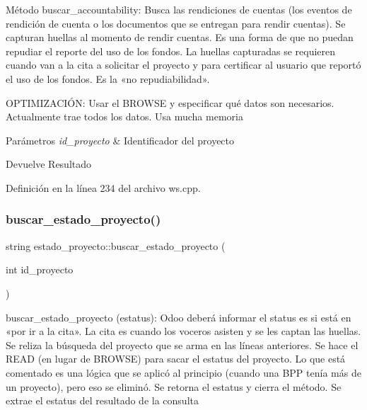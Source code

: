 Método buscar\+\_\+accountability\+: Busca las rendiciones de cuentas (los eventos de rendición de cuenta o los documentos que se entregan para rendir cuentas). Se capturan huellas al momento de rendir cuentas. Es una forma de que no puedan repudiar el reporte del uso de los fondos. La huellas capturadas se requieren cuando van a la cita a solicitar el proyecto y para certificar al usuario que reportó el uso de los fondos. Es la «no repudiabilidad». 

O\+P\+T\+I\+M\+I\+Z\+A\+C\+IÓN\+: Usar el B\+R\+O\+W\+SE y especificar qué datos son necesarios. Actualmente trae todos los datos. Usa mucha memoria


\begin{DoxyParams}{Parámetros}
{\em id\+\_\+proyecto} & Identificador del proyecto \\
\hline
\end{DoxyParams}
\begin{DoxyReturn}{Devuelve}
Resultado 
\end{DoxyReturn}


Definición en la línea 234 del archivo ws.\+cpp.

\hypertarget{classestado__proyecto_a888654e845012a36987ae8b1956f2841}{}\label{classestado__proyecto_a888654e845012a36987ae8b1956f2841} 
\subsubsection{\texorpdfstring{buscar\+\_\+estado\+\_\+proyecto()}{buscar\_estado\_proyecto()}}
{\footnotesize\ttfamily string estado\+\_\+proyecto\+::buscar\+\_\+estado\+\_\+proyecto (\begin{DoxyParamCaption}\item[{int}]{id\+\_\+proyecto }\end{DoxyParamCaption})}



buscar\+\_\+estado\+\_\+proyecto (estatus)\+: Odoo deberá informar el status es si está en «por ir a la cita». La cita es cuando los voceros asisten y se les captan las huellas. Se reliza la búsqueda del proyecto que se arma en las líneas anteriores. Se hace el R\+E\+AD (en lugar de B\+R\+O\+W\+SE) para sacar el estatus del proyecto. Lo que está comentado es una lógica que se aplicó al principio (cuando una B\+PP tenía más de un proyecto), pero eso se eliminó. Se retorna el estatus y cierra el método. Se extrae el estatus del resultado de la consulta 

